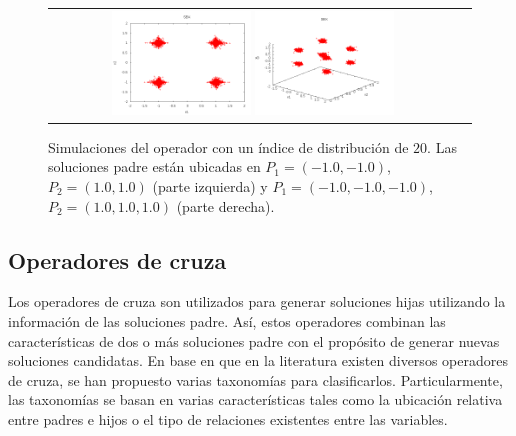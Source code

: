 %
\begin{figure}[!t]
\centering
\begin{tabular}{cc}
   \includegraphics[width=0.35\textwidth]{img/Operadores/SBX_eta_20_2D.png} 
   \includegraphics[width=0.35\textwidth]{img/Operadores/SBX_eta_20_3D.png} 
\end{tabular}
\caption{Simulaciones del operador \SBX{} con un índice de distribución de $20$. Las soluciones padre están ubicadas en $P_1=(-1.0, -1.0)$, $P_2=(1.0, 1.0)$ (parte izquierda) y $P_1=(-1.0, -1.0, -1.0)$, $P_2=(1.0, 1.0, 1.0)$ (parte derecha).}
\label{fig:Simulations_Index_20}
\end{figure}


\subsection{Operadores de cruza}

Los operadores de cruza son utilizados para generar soluciones hijas utilizando la información de las soluciones padre.
%
Así, estos operadores combinan las características de dos o más soluciones padre con el propósito de generar nuevas soluciones candidatas.
%
En base en que en la literatura existen diversos operadores de cruza, se han propuesto varias taxonomías para clasificarlos.
%
Particularmente, las taxonomías se basan en varias características tales como la ubicación relativa entre padres e hijos o el tipo 
de relaciones existentes entre las variables.

